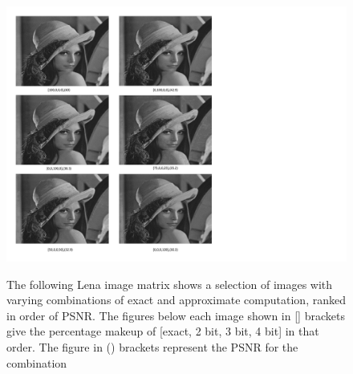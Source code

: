 \documentclass[journal]{IEEEtran}
\begin{document}
\begin{figure}[htbp]
  \centering
  \caption{The following Lena image matrix shows a selection of images with varying combinations of exact and approximate computation, ranked in order of PSNR. The figures below each image shown in [] brackets give the percentage makeup of [exact, 2 bit, 3 bit, 4 bit] in that order. The figure in () brackets represent the PSNR for the combination}
  \includegraphics[width=10in]{LenaMatrix3.pdf}
  \label{fig:LenaMat3}
\end{figure}

\end{document}
